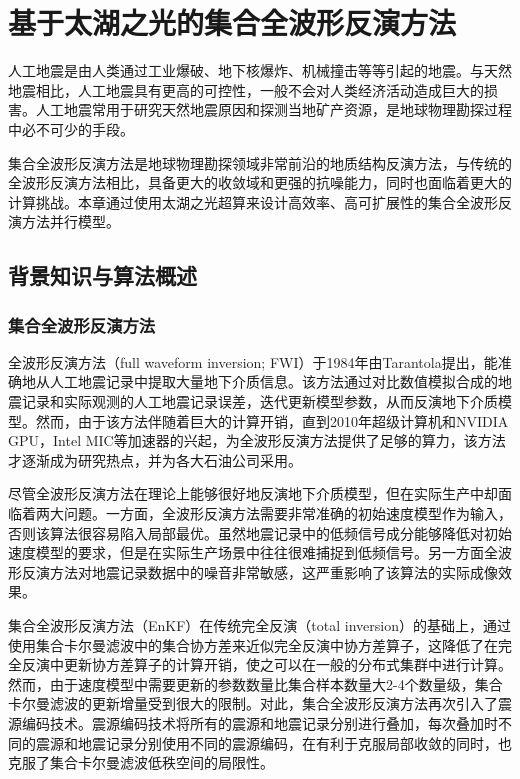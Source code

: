 \chapter{基于太湖之光的集合全波形反演方法}
\label{ch:基于太湖之光的集合全波形反演方法}
人工地震是由人类通过工业爆破、地下核爆炸、机械撞击等等引起的地震。与天然地震相比，人工地震具有更高的可控性，一般不会对人类经济活动造成巨大的损害。人工地震常用于研究天然地震原因和探测当地矿产资源，是地球物理勘探过程中必不可少的手段。

集合全波形反演方法是地球物理勘探领域非常前沿的地质结构反演方法，与传统的全波形反演方法相比，具备更大的收敛域和更强的抗噪能力，同时也面临着更大的计算挑战。本章通过使用太湖之光超算来设计高效率、高可扩展性的集合全波形反演方法并行模型。

\section{背景知识与算法概述}

\subsection{集合全波形反演方法}

全波形反演方法（full waveform inversion; FWI）于1984年由Tarantola提出，能准确地从人工地震记录中提取大量地下介质信息\cite{tarantola1984inversion,plessix2012full,brossier2009seismic}。该方法通过对比数值模拟合成的地震记录和实际观测的人工地震记录误差，迭代更新模型参数，从而反演地下介质模型\cite{yushu}。然而，由于该方法伴随着巨大的计算开销，直到2010年超级计算机和NVIDIA GPU，Intel MIC等加速器的兴起，为全波形反演方法提供了足够的算力，该方法才逐渐成为研究热点，并为各大石油公司采用。

尽管全波形反演方法在理论上能够很好地反演地下介质模型，但在实际生产中却面临着两大问题。一方面，全波形反演方法需要非常准确的初始速度模型作为输入，否则该算法很容易陷入局部最优\cite{virieux2009overview}。虽然地震记录中的低频信号成分能够降低对初始速度模型的要求，但是在实际生产场景中往往很难捕捉到低频信号\cite{sirgue2006importance}。另一方面全波形反演方法对地震记录数据中的噪音非常敏感，这严重影响了该算法的实际成像效果。

集合全波形反演方法（EnKF）\cite{yushu,he2015ensemble}在传统完全反演\cite{tarantola1982generalized}（total inversion）的基础上，通过使用集合卡尔曼滤波\cite{evensen2003ensemble}中的集合协方差来近似完全反演中协方差算子，这降低了在完全反演中更新协方差算子的计算开销，使之可以在一般的分布式集群中进行计算。然而，由于速度模型中需要更新的参数数量比集合样本数量大2-4个数量级，集合卡尔曼滤波的更新增量受到很大的限制。对此，集合全波形反演方法再次引入了震源编码技术\cite{krebs2009fast}。震源编码技术将所有的震源和地震记录分别进行叠加，每次叠加时不同的震源和地震记录分别使用不同的震源编码，在有利于克服局部收敛的同时\cite{castellanos2014fast}，也克服了集合卡尔曼滤波低秩空间的局限性。

